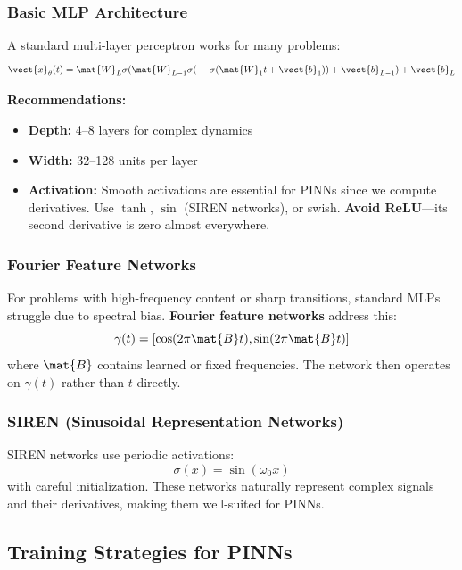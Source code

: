 \subsubsection{Basic MLP Architecture}

A standard multi-layer perceptron works for many problems:
\begin{equation}
\vect{x}_\theta(t) = \mat{W}_L \sigma(\mat{W}_{L-1} \sigma(\cdots \sigma(\mat{W}_1 t + \vect{b}_1)) + \vect{b}_{L-1}) + \vect{b}_L
\end{equation}

\textbf{Recommendations:}
\begin{itemize}
    \item \textbf{Depth:} 4--8 layers for complex dynamics
    \item \textbf{Width:} 32--128 units per layer
    \item \textbf{Activation:} Smooth activations are essential for PINNs since we compute derivatives. Use $\tanh$, $\sin$ (SIREN networks), or swish. \textbf{Avoid ReLU}---its second derivative is zero almost everywhere.
\end{itemize}

\subsubsection{Fourier Feature Networks}

For problems with high-frequency content or sharp transitions, standard MLPs struggle due to spectral bias. \textbf{Fourier feature networks} address this:
\begin{equation}
\gamma(t) = [\cos(2\pi \mat{B} t), \sin(2\pi \mat{B} t)]
\end{equation}
where $\mat{B}$ contains learned or fixed frequencies. The network then operates on $\gamma(t)$ rather than $t$ directly.

\subsubsection{SIREN (Sinusoidal Representation Networks)}

SIREN networks use periodic activations:
\begin{equation}
\sigma(x) = \sin(\omega_0 x)
\end{equation}
with careful initialization. These networks naturally represent complex signals and their derivatives, making them well-suited for PINNs.

\subsection{Training Strategies for PINNs}

